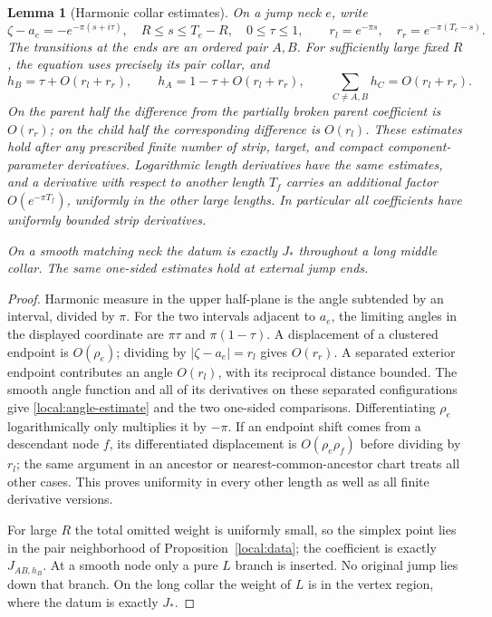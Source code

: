 \documentclass[11pt]{article}
\newtheorem{lemma}[theorem]{Lemma}
\theoremstyle{definition}
\theoremstyle{remark}
\numberwithin{equation}{section}
\begin{document}
\begin{lemma}[Harmonic collar estimates]\label{local:neck-coefficients}
On a jump neck $e$, write
\[
 \zeta-a_e=-e^{-\pi(s+i\tau)},\quad
 R\leq s\leq T_e-R,\quad 0\leq\tau\leq1,
 \qquad r_l=e^{-\pi s},\quad r_r=e^{-\pi(T_e-s)}.
\]
The transitions at the ends are an ordered pair $A,B$.  For sufficiently
large fixed $R$, the equation uses precisely its pair collar, and
\begin{equation}\label{local:angle-estimate}
 h_B=\tau+O(r_l+r_r),\qquad
 h_A=1-\tau+O(r_l+r_r),\qquad
 \sum_{C\ne A,B}h_C=O(r_l+r_r).
\end{equation}
On the parent half the difference from the partially broken parent
coefficient is $O(r_r)$; on the child half the corresponding difference
is $O(r_l)$.  These estimates hold after any prescribed finite number of
strip, target, and compact component-parameter derivatives.  Logarithmic
length derivatives have the same estimates, and a derivative with
respect to another length $T_f$ carries an additional factor
$O(e^{-\pi T_f})$, uniformly in the other large lengths.  In particular
all coefficients have uniformly bounded strip derivatives.

On a smooth matching neck the datum is exactly $J_*$ throughout a long
middle collar.  The same one-sided estimates hold at external jump ends.
\end{lemma}
\begin{proof}
Harmonic measure in the upper half-plane is the angle subtended by an
interval, divided by $\pi$.  For the two intervals adjacent to $a_e$,
the limiting angles in the displayed coordinate are $\pi\tau$ and
$\pi(1-\tau)$.  A displacement of a clustered endpoint is $O(\rho_e)$;
dividing by $|\zeta-a_e|=r_l$ gives $O(r_r)$.  A separated exterior
endpoint contributes an angle $O(r_l)$, with its reciprocal distance
bounded.  The smooth angle function and all of its derivatives on these
separated configurations give \eqref{local:angle-estimate} and the two
one-sided comparisons.  Differentiating $\rho_e$ logarithmically only
multiplies it by $-\pi$.  If an endpoint shift comes from a descendant
node $f$, its differentiated displacement is $O(\rho_e\rho_f)$ before
dividing by $r_l$; the same argument in an ancestor or nearest-common-ancestor chart treats all other cases.  This proves uniformity in every
other length as well as all finite derivative versions.

For large $R$ the total omitted weight is uniformly small, so the
simplex point lies in the pair neighborhood of
Proposition~\ref{local:data}; the coefficient is exactly $J_{AB,h_B}$.
At a smooth node only a pure $L$ branch is inserted.  No original jump
lies down that branch.  On the long collar the weight of $L$ is in the
vertex region, where the datum is exactly $J_*$.
\end{proof}
\end{document}
